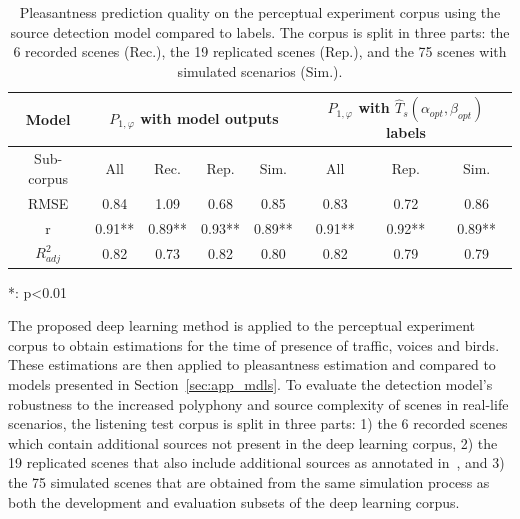 \documentclass[twocolumn]{article}
\begin{document}
\begin{table}[t]
\centering
\caption{Pleasantness prediction quality on the perceptual experiment corpus using the source detection model compared to labels. The corpus is split in three parts: the 6 recorded scenes (Rec.), the 19 replicated scenes (Rep.), and the 75 scenes with simulated scenarios (Sim.).}
\label{tab:pppred}
\begin{threeparttable}
\begin{tabular}{ c | c c c c | c c c }
\hline
	Model & \multicolumn{4}{|c}{$P_{1, \varphi}$ with model outputs} & \multicolumn{3}{|c}{$P_{1, \varphi}$ with $\hat T_s(\alpha_{opt}, \beta_{opt})$ labels} \\ \hline
	Sub-corpus & All & Rec. & Rep. & Sim. & All & Rep. & Sim. \\ \hline
	RMSE & 0.84 & 1.09 & 0.68 & 0.85 & 0.83 & 0.72 & 0.86 \\ \hline
	r & 0.91** & 0.89** & 0.93** & 0.89** & 0.91** & 0.92** & 0.89** \\ \hline
	$R^2_{adj}$ & 0.82 & 0.73 & 0.82 & 0.80 & 0.82 & 0.79 & 0.79 \\ \hline
\end{tabular}
\begin{tablenotes}
\item **: p<0.01
\end{tablenotes}
\end{threeparttable}
\end{table}


The proposed deep learning method is applied to the perceptual experiment corpus to obtain estimations for the time of presence of traffic, voices and birds. These estimations are then applied to pleasantness estimation and compared to models presented in Section~\ref{sec:app_mdls}. To evaluate the detection model's robustness to the increased polyphony and source complexity of scenes in real-life scenarios, the listening test corpus is split in three parts: 1) the 6 recorded scenes which contain additional sources not present in the deep learning corpus, 2) the 19 replicated scenes that also include additional sources as annotated in~\cite{gloaguen2017}, and 3) the 75 simulated scenes that are obtained from the same simulation process as both the development and evaluation subsets of the deep learning corpus.
\end{document}
